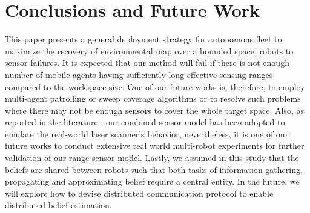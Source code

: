\documentclass[letterpaper, 10 pt, conference]{ieeeconf}
\begin{document}
\section{Conclusions and Future Work}
\label{sec:sec9}
This paper presents a general deployment strategy for autonomous fleet to maximize the recovery of environmental map over a bounded space, robots to sensor failures. 
It is expected that our method will fail if there is not enough number of mobile agents having sufficiently long effective sensing ranges compared to the workspace size. 
One of our future works is, therefore, to employ multi-agent patrolling \cite{portugal2011survey} or sweep coverage \cite{rekleitis2004limited} algorithms or to resolve such problems where there may not be enough sensors to cover the whole target space.
Also, as reported in the literature \cite{anguelov2004detecting}, our combined sensor model has been adopted to emulate the real-world laser scanner's behavior, nevertheless, it is one of our future works to conduct extensive real world multi-robot experiments for further validation of our range sensor model.
Lastly, we assumed in this study that the beliefs are shared between robots such that both tasks of information gathering, propagating and approximating belief require a central entity. 
In the future, we will explore how to devise distributed communication protocol to enable distributed belief estimation. 




\end{document}
